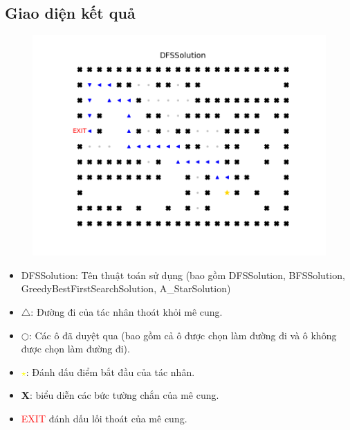 \documentclass[11pt]{scrartcl} %
\begin{document}
\subsection{Giao diện kết quả}
	\begin{figure}[h] %
		\centering
		\includegraphics[width=0.8\columnwidth]{Figures/fg1_dfs.png} %
	\end{figure}
\begin{itemize}
	\item DFSSolution: Tên thuật toán sử dụng (bao gồm DFSSolution, BFSSolution, GreedyBestFirstSearchSolution, A\_StarSolution) \\
	\item \textbf{$\triangle$}: Đường đi của tác nhân thoát khỏi mê cung. \\
	\item \textbf{$\bigcirc$}: Các ô đã duyệt qua (bao gồm cả ô được chọn làm đường đi và ô không được chọn làm đường đi).\\
	\item \textcolor{yellow}{\textbf{$\star$}}: Đánh dấu điểm bắt đầu của tác nhân. \\
	\item \textbf{X}: biểu diễn các bức tường chắn của mê cung.\\
	\item \textcolor{red}{EXIT} đánh dấu lối thoát của mê cung.\
\end{itemize}

\newpage
\end{document}
